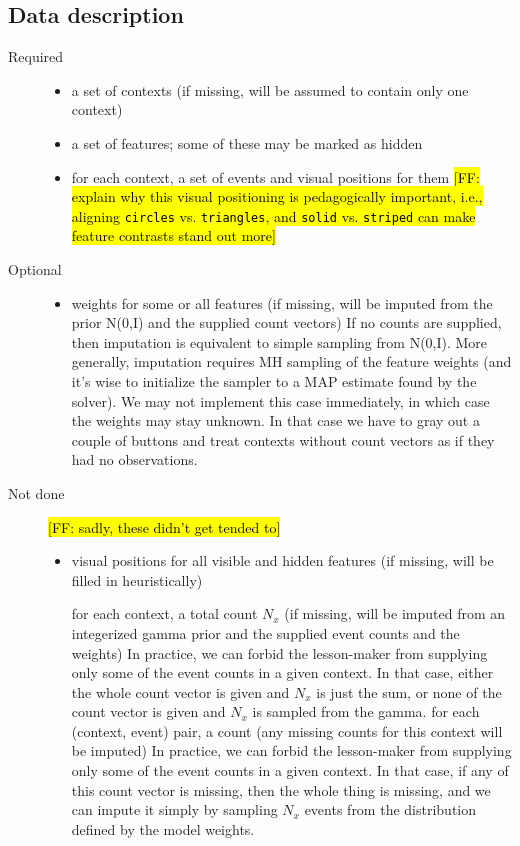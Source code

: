 \documentclass[11pt,letterpaper]{article}
\newcommand{\Note}[1]{}
\renewcommand{\Note}[1]{\hl{[#1]}}
\newcommand{\NoteSigned}[3]{{\sethlcolor{#2}\Note{#1: #3}}}
\newcommand{\NoteFF}[1]{\NoteSigned{FF}{LightBlue}{#1}}
\begin{document}
\subsection{Data description}
\begin{description}
\item[Required]

\begin{itemize}
\item a set of contexts (if missing, will be assumed to contain only one context)
\item a set of features; some of these may be marked as hidden
\item for each context, a set of events and visual positions for them \NoteFF{explain why this visual positioning is pedagogically important, i.e., aligning \texttt{circles} vs. \texttt{triangles}, and \texttt{solid} vs. \texttt{striped} can make feature contrasts stand out more}
\end{itemize}

\item[Optional]

\begin{itemize}
\item weights for some or all features (if missing, will be imputed from the prior N(0,I) and the supplied count vectors)
If no counts are supplied, then imputation is equivalent to simple sampling from N(0,I).
More generally, imputation requires MH sampling of the feature weights (and it’s wise to initialize the sampler to a MAP estimate found by the solver).  We may not implement this case immediately, in which case the weights may stay unknown.  In that case we have to gray out a couple of buttons and treat contexts without count vectors as if they had no observations.
\end{itemize}

\item[Not done] \NoteFF{sadly, these didn't get tended to}
\begin{itemize}
\item visual positions for all visible and hidden features (if missing, will be filled in heuristically)

for each context, a total count $N_x$ (if missing, will be imputed from an integerized gamma prior and the supplied event counts and the weights)
In practice, we can forbid the lesson-maker from supplying only some of the event counts in a given context.  In that case, either the whole count vector is given and $N_x$ is just the sum, or none of the count vector is given and $N_x$ is sampled from the gamma.
for each (context, event) pair, a count (any missing counts for this context will be imputed)
In practice, we can forbid the lesson-maker from supplying only some of the event counts in a given context.  In that case, if any of this count vector is missing, then the whole thing is missing, and we can impute it simply by sampling $N_x$ events from the distribution defined by the model weights.
\end{itemize}
\end{description}




\end{document}
